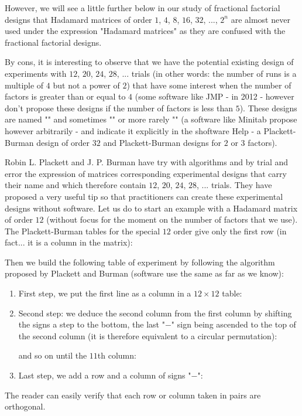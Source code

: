 	However, we will see a little further below in our study of fractional factorial designs that Hadamard matrices of order $1$, $4$, $8$, $16$, $32$, ..., $2^n$ are almost never used under the expression "Hadamard matrices" as they are confused with the fractional factorial designs.
	
	By cons, it is interesting to observe that we have the potential existing design of experiments with $12$, $20$, $24$, $28$, ... trials (in other words:  the number of runs is a multiple of $4$ but not a power of $2$) that have some interest when the number of factors is greater than or equal to $4$ (some software like JMP - in 2012 - however don't propose these designs if the number of factors is less than $5$). These designs are named "" and sometimes "" or more rarely "" (a software like Minitab propose however arbitrarily - and indicate it explicitly in the shoftware Help - a Plackett-Burman design of order $32$ and Plackett-Burman designs for $2$ or $3$ factors).

	 Robin L. Plackett and J. P. Burman have try with algorithms and by trial and error the expression of matrices corresponding  experimental designs that carry their name and which therefore contain $12$, $20$, $24$, $28$, ... trials. They have proposed a very useful tip so that practitioners can create these experimental designs without software. Let us do to start an example  with a Hadamard matrix of order $12$ (without focus for the moment on the number of factors that we use). The Plackett-Burman tables for the special $12$ order give only the first row (in fact... it is a column in the matrix):
	 
		Then we build the following table of experiment by following the algorithm proposed by Plackett and Burman (software use the same as far as we know):
	\begin{enumerate}
		\item First step, we put the first line as a column in a $12\times 12$ table:
		 
			
		
		\item Second step: we deduce the second column from the first column by shifting the signs a step to the bottom, the last "$-$" sign being ascended to the top of the second column (it is therefore equivalent to a circular permutation):
			
		and so on until the $11$th column:
		
		
		\item Last step, we add a row and a column of signs "$-$":
		
	\end{enumerate}
	The reader can easily verify that each row or column taken in pairs are orthogonal.
	
